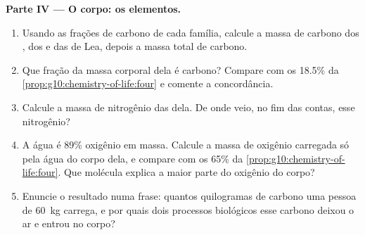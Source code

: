 \begin{problem}
\medskip
\noindent\textbf{Parte IV --- O corpo: os elementos.}
\begin{enumerate}[resume]
  \item Usando as frações de carbono de cada família, calcule a massa
        de carbono dos , dos  e das  de
        Lea, depois a massa total de carbono.
  \item Que fração da massa corporal dela é carbono? Compare com os
        18.5\% da \cref{prop:g10:chemistry-of-life:four} e comente a
        concordância.
  \item Calcule a massa de nitrogênio das  dela. De onde veio,
        no fim das contas, esse nitrogênio?
  \item A água é 89\% oxigênio em massa. Calcule a massa de oxigênio
        carregada só pela água do corpo dela, e compare com os 65\% da
        \cref{prop:g10:chemistry-of-life:four}. Que molécula explica a
        maior parte do oxigênio do corpo?
  \item Enuncie o resultado numa frase: quantos quilogramas de carbono
        uma pessoa de \qty{60}{kg} carrega, e por quais dois processos
        biológicos esse carbono deixou o ar e entrou no corpo?
\end{enumerate}
\end{problem}
